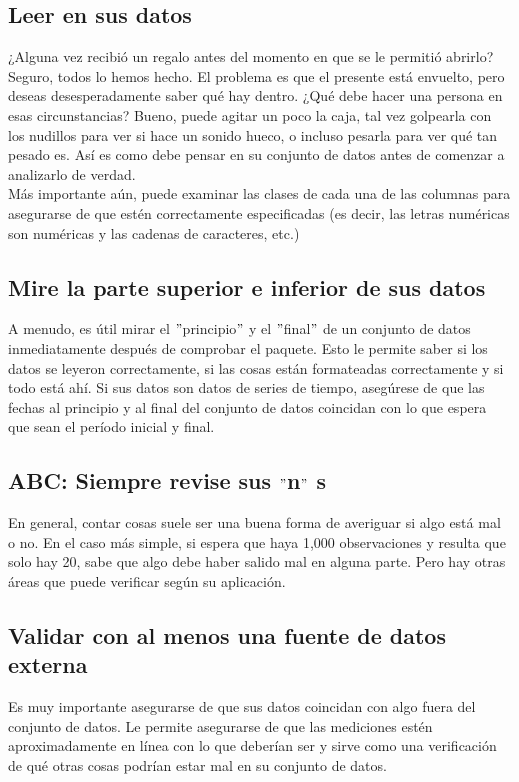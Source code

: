 \documentclass[10pt]{book}
\begin{document}
        \subsection{Leer en sus datos}
        ¿Alguna vez recibió un regalo antes del momento en que se le permitió abrirlo? Seguro, todos lo hemos hecho. El problema es que el presente está envuelto, pero deseas desesperadamente saber qué hay dentro. ¿Qué debe hacer una persona en esas circunstancias? Bueno, puede agitar un poco la caja, tal vez golpearla con los nudillos para ver si hace un sonido hueco, o incluso pesarla para ver qué tan pesado es. Así es como debe pensar en su conjunto de datos antes de comenzar a analizarlo de verdad. \\
        Más importante aún, puede examinar las clases de cada una de las columnas para asegurarse de que estén correctamente especificadas (es decir, las letras numéricas son numéricas y las cadenas de caracteres, etc.)

        \subsection{Mire la parte superior e inferior de sus datos}
        A menudo, es útil mirar el $"$principio$"$ y el $"$final$"$ de un conjunto de datos inmediatamente después de comprobar el paquete. Esto le permite saber si los datos se leyeron correctamente, si las cosas están formateadas correctamente y si todo está ahí. Si sus datos son datos de series de tiempo, asegúrese de que las fechas al principio y al final del conjunto de datos coincidan con lo que espera que sean el período inicial y final.\\

        \subsection{ABC: Siempre revise sus $"$n$"$ s}
        En general, contar cosas suele ser una buena forma de averiguar si algo está mal o no. En el caso más simple, si espera que haya 1,000 observaciones y resulta que solo hay 20, sabe que algo debe haber salido mal en alguna parte. Pero hay otras áreas que puede verificar según su aplicación.

        \subsection{Validar con al menos una fuente de datos externa}
        Es muy importante asegurarse de que sus datos coincidan con algo fuera del conjunto de datos. Le permite asegurarse de que las mediciones estén aproximadamente en línea con lo que deberían ser y sirve como una verificación de qué otras cosas podrían estar mal en su conjunto de datos.\\
\end{document}
